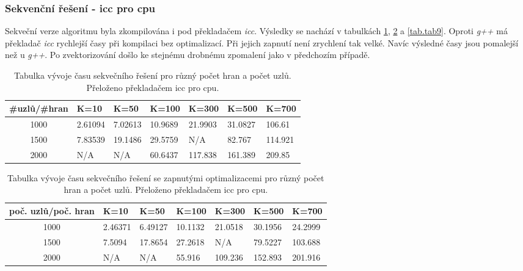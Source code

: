 \documentclass[a4paper,11pt]{article}
\begin{document}
  \subsubsection{Sekvenční řešení - icc pro cpu} 
 Sekveční verze algoritmu byla zkompilována i pod překladačem \textit{icc}. Výsledky se nachází v tabulkách
 \ref{tab.tab7}, \ref{tab.tab8} a \ref{tab.tab9}. Oproti \textit{g++} má překladač \textit{icc} rychlejší
 časy při kompilaci bez optimalizací. Při jejich zapnutí není zrychlení tak velké. Navíc výsledné časy jsou
 pomalejší než u \textit{g++}. Po zvektorizování došlo ke stejnému drobnému zpomalení jako v předchozím 
 případě.
   \begin{table}[ht]
  \begin{center}
   \begin{tabular}{|c|l|l|l|l|l|l|}
    \hline 
    \#uzlů/\#hran & K=10 & K=50 & K=100 & K=300 & K=500 & K=700\\
   \hline 
   \hline 
   1000 & 2.61094 & 7.02613 & 10.9689 & 21.9903  & 31.0827 & 106.61\\
   \hline
    1500 & 7.83539 & 19.1486 & 29.5759 & N/A & 82.767 & 114.921\\
    \hline
    2000 & N/A & N/A & 60.6437 & 117.838 & 161.389 & 209.85\\
    \hline
    \end{tabular}
   \caption{Tabulka vývoje času sekvečního řešení pro různý počet hran a počet uzlů. Přeloženo překladačem icc pro cpu.} 
   \label{tab.tab7}
  \end{center}   
  \end{table}
  
  \begin{table}[ht]
  \begin{center}
   \begin{tabular}{|c|l|l|l|l|l|l|}
    \hline 
    poč. uzlů/poč. hran & K=10 & K=50 & K=100 & K=300 & K=500 & K=700\\
   \hline 
   \hline 
   1000 & 2.46371 & 6.49127 & 10.1132 & 21.0518  & 30.1956 & 24.2999\\
   \hline
    1500 & 7.5094 & 17.8654 &  27.2618 & N/A & 79.5227 & 103.688\\
    \hline
    2000 & N/A & N/A & 55.916 & 109.236 & 152.893 & 201.916\\
    \hline
    \end{tabular}
   \caption{Tabulka vývoje času sekvečního řešení se zapnutými optimalizacemi pro různý počet hran a počet uzlů. Přeloženo překladačem icc pro cpu.} 
   \label{tab.tab8}
  \end{center}   
  \end{table}
  
\end{document}
